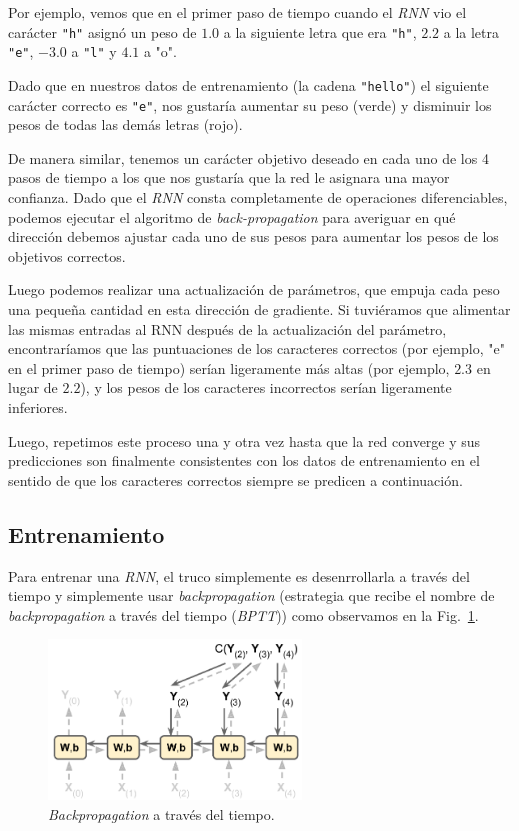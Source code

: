 \documentclass[a4paper,12pt]{article}
\begin{document}
Por ejemplo, vemos que en el primer paso de tiempo cuando el \textit{RNN} vio el carácter \texttt{"h"} asignó un peso de $1.0$ a la siguiente letra que era \texttt{"h"}, $2.2$ a la letra \texttt{"e"}, $-3.0$ a \texttt{"l"} y $4.1$ a "o". 

Dado que en nuestros datos de entrenamiento (la cadena \texttt{"hello"}) el siguiente carácter correcto es \texttt{"e"}, nos gustaría aumentar su peso (verde) y disminuir los pesos de todas las demás letras (rojo). 

De manera similar, tenemos un carácter objetivo deseado en cada uno de los 4 pasos de tiempo a los que nos gustaría que la red le asignara una mayor confianza. Dado que el \textit{RNN} consta completamente de operaciones diferenciables, podemos ejecutar el algoritmo de \textit{back-propagation} para averiguar en qué dirección debemos ajustar cada uno de sus pesos para aumentar los pesos de los objetivos correctos. 

Luego podemos realizar una actualización de parámetros, que empuja cada peso una pequeña cantidad en esta dirección de gradiente. Si tuviéramos que alimentar las mismas entradas al RNN después de la actualización del parámetro, encontraríamos que las puntuaciones de los caracteres correctos (por ejemplo, "e" en el primer paso de tiempo) serían ligeramente más altas (por ejemplo, $2.3$ en lugar de $2.2$), y los pesos de los caracteres incorrectos serían ligeramente inferiores.

Luego, repetimos este proceso una y otra vez hasta que la red converge y sus predicciones son finalmente consistentes con los datos de entrenamiento en el sentido de que los caracteres correctos siempre se predicen a continuación.

\subsection{Entrenamiento}
Para entrenar una \textit{RNN}, el truco simplemente es desenrrollarla a través del tiempo y simplemente usar \textit{backpropagation} (estrategia que recibe el nombre de \textit{backpropagation} a través del tiempo (\textit{BPTT})) como observamos en la Fig.~\ref{fig:BPTT}.

\begin{figure}[H]
	\begin{center}				
		\includegraphics[width=0.6\textwidth]{tesis_40.png}
		\caption{\textit{Backpropagation} a través del tiempo.\citep{geron}}
		\label{fig:BPTT}
	\end{center}
\end{figure}
\end{document}

